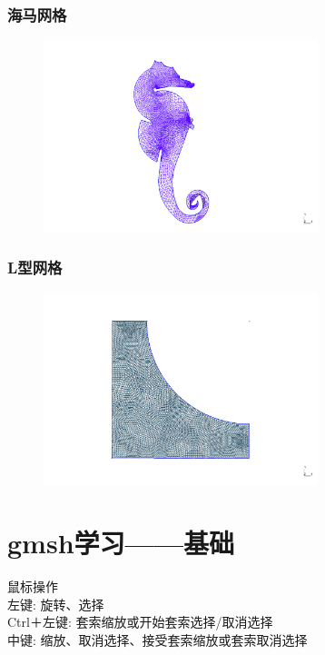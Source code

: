 \documentclass[12pt]{article}
\begin{document}
\begin{CJK}{UTF8}{gkai}
\subsubsection{海马网格}

\begin{figure}[H]
	\centering
	\includegraphics[width=8cm]{haima.png}
	\caption{}  		
\end{figure}

\subsubsection{L型网格}

\begin{figure}[H]
	\centering
	\includegraphics[width=8cm]{L.png}
	\caption{}  		
\end{figure}
\section{gmsh学习——基础}

鼠标操作\\

左键:       旋转、选择\\

Ctrl＋左键: 套索缩放或开始套索选择/取消选择\\

中键:       缩放、取消选择、接受套索缩放或套索取消选择\\


\end{CJK}
\end{document}
